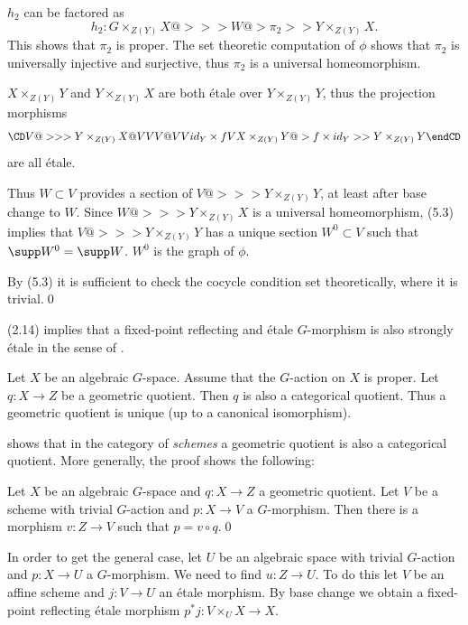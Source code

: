 $h_2$ can be factored as
$$
h_2:G\times_{Z(Y)}X@>>> W @>\pi_2>> Y\times_{Z(Y)}X.
$$
This shows that $\pi_2$ is proper. The set theoretic
computation of $\phi$ shows that $\pi_2$ is universally injective and
surjective, thus $\pi_2$ is a universal homeomorphism.


$X\times_{Z(Y)}Y$ and $Y\times_{Z(Y)}X$ are both \'etale over
$Y\times_{Z(Y)}Y$, thus  the projection morphisms
$$
\CD
V@>>> Y\times_{Z(Y)}X\\
@VVV @VV{id_Y\times f}V\\
X\times_{Z(Y)}Y@>{f\times id_Y}>> Y\times_{Z(Y)}Y
\endCD
$$
are all \'etale.


Thus $W\subset V$ provides a section of $V@>>> Y\times_{Z(Y)}Y$, at least
after  base change  to $W$. Since
$W @>>> Y\times_{Z(Y)}X$ is  a universal homeomorphism,   (5.3) implies that
$V@>>> Y\times_{Z(Y)}Y$ has a unique section $W^0\subset V$ such that $\supp
W^0=\supp W$. $W^0$ is the  graph of  $\phi$.

By (5.3) it is sufficient to check the cocycle condition  set
theoretically, where it is trivial.\qed\enddemo

 (2.14) implies that a fixed-point reflecting and \'etale
$G$-morphism is also strongly \'etale in the sense of \cite{Mumford-Fogarty82,
p. 152}.
\enddemo


 Let $X$ be an algebraic $G$-space. Assume that the
$G$-action on $X$ is proper. Let $q:X\to Z$ be a geometric quotient.
Then $q$ is also a categorical quotient. Thus a geometric quotient is unique
(up to a canonical isomorphism).
\endproclaim

\demop
\cite{Mumford-Fogarty82, p.4} shows that in the
category of {\it schemes} a geometric quotient is also a categorical quotient.
 More generally, the proof
shows the following:

 Let $X$ be an algebraic $G$-space and $q:X\to Z$  a
geometric quotient.  Let $V$ be a scheme with trivial $G$-action and
$p:X\to V$  a $G$-morphism. Then there is a morphism $v:Z\to V$ such that
$p=v\circ q$.\qed
\endproclaim



In order to get the general case, let $U$ be an algebraic space with trivial
$G$-action and
$p:X\to U$  a $G$-morphism. We need to find $u:Z\to U$. To do this let $V$ be
an affine scheme and $j:V\to U$ an \'etale morphism. By base change we obtain
a fixed-point reflecting
\'etale morphism $p^*j:V\times_UX\to X$.

